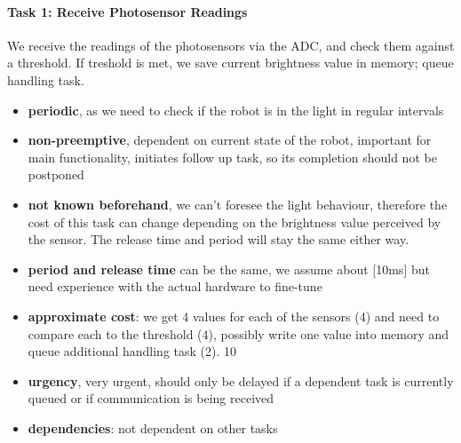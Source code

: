 \documentclass[12pt]{article}
\begin{document}
\paragraph{Task 1: Receive Photosensor Readings}
We receive the readings of the photosensors via the ADC, and check them against a threshold.
If treshold is met, we save current brightness value in memory; queue handling task.
\begin{itemize}
	\item \textbf{periodic}, as we need to check if the robot is in the light in regular intervals
	\item \textbf{non-preemptive}, dependent on current state of the robot, important for main functionality, initiates follow up task, so its completion should not be postponed
	\item \textbf{not known beforehand}, we can't foresee the light behaviour, therefore the cost of this task can change depending on the brightness value perceived by the sensor. The release time and period will stay the same either way.
	\item \textbf{period and release time} can be the same, we assume about [10ms] but need experience with the actual hardware to fine-tune
	\item \textbf{approximate cost}: we get 4 values for each of the sensors (4) and need to compare each to the threshold (4), possibly write one value into memory and queue additional handling task (2). 10
	\item \textbf{urgency}, very urgent, should only be delayed if a dependent task is currently queued or if communication is being received
	\item \textbf{dependencies}: not dependent on other tasks
\end{itemize}
\end{document}
